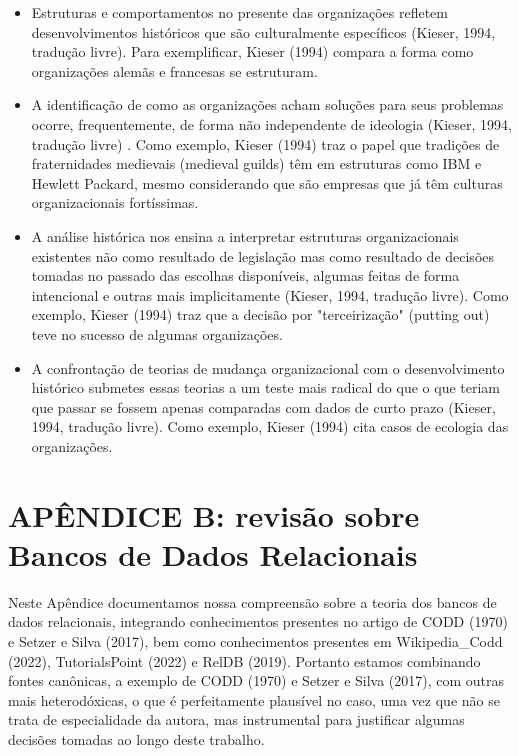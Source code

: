 \begin{itemize}
\item Estruturas e comportamentos no presente das organizações refletem desenvolvimentos históricos que são culturalmente específicos  (Kieser, 1994, tradução livre). Para exemplificar,  Kieser (1994) compara a forma como organizações alemãs e francesas se estruturam.
\item A identificação de como as organizações acham soluções para seus problemas ocorre, frequentemente, de forma não independente de ideologia  (Kieser, 1994, tradução livre) . Como exemplo,  Kieser (1994) traz o papel  que tradições de fraternidades medievais (medieval guilds) têm em estruturas como IBM e Hewlett Packard, mesmo considerando que são empresas que já têm culturas organizacionais fortíssimas.
\item A análise histórica nos ensina a interpretar estruturas organizacionais existentes não como resultado de legislação mas como resultado de decisões tomadas no passado das escolhas disponíveis, algumas feitas de forma intencional e outras mais implicitamente  (Kieser, 1994, tradução livre). Como exemplo,  Kieser (1994) traz que a decisão por "terceirização" (putting out) teve no sucesso de algumas organizações.
\item A confrontação de teorias de mudança organizacional com o desenvolvimento histórico submetes essas teorias a um teste mais radical do que o que teriam que passar se fossem apenas comparadas com dados de curto prazo (Kieser, 1994, tradução livre). Como exemplo,  Kieser (1994) cita casos de ecologia das organizações.
\end{itemize}

\chapter[APÊNDICE B: revisão sobre Bancos de Dados Relacionais]{APÊNDICE B: revisão sobre Bancos de Dados Relacionais}\label{APÊNDICE B: revisão sobre Bancos de Dados Relacionais}
Neste Apêndice documentamos nossa compreensão sobre a teoria dos bancos de dados relacionais, integrando conhecimentos presentes no artigo de  CODD (1970) e  Setzer e Silva (2017), bem como conhecimentos presentes em Wikipedia\_Codd (2022),  TutorialsPoint (2022) e  RelDB (2019). Portanto estamos combinando fontes canônicas, a exemplo de  CODD (1970) e Setzer e Silva (2017), com outras mais heterodóxicas, o que é perfeitamente plausível no caso, uma vez que não se trata de especialidade da autora, mas instrumental para justificar algumas decisões tomadas ao longo deste trabalho.

